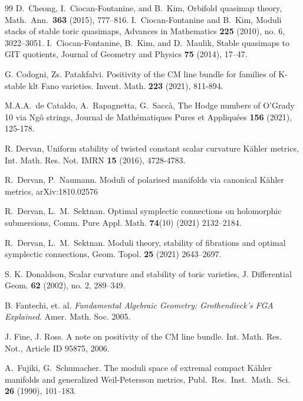 \documentclass[12pt,twoside]{amsart}
\theoremstyle{definition}
\begin{document}
\begin{thebibliography}{99}
D.~Cheong, I.~Ciocan-Fontanine, and B.~Kim, Orbifold quasimap theory, Math.~Ann.~{\bf363} (2015), 777–816.
 I.~Ciocan-Fontanine and B.~Kim, Moduli stacks of stable toric quasimaps, Advances in Mathematics {\bf225} (2010), no. 6, 3022–3051.
 I.~Ciocan-Fontanine, B.~Kim, and D.~Maulik, Stable quasimaps to GIT quotients, Journal of Geometry and Physics {\bf75} (2014), 17–47.




 G. Codogni, Zs. Patakfalvi. Positivity of the CM line bundle for families of K-stable klt Fano varieties. Invent. Math. {\bf223}  (2021), 811-894.


 M.A.A.~de Cataldo, A.~Rapagnetta, G.~Sacc\`{a}, The Hodge numbers of O'Grady 10 via Ng\^{o} strings, Journal de Math\'{e}matiques Pures et Appliqu\'ees
{\bf156} (2021), 125-178.



 R. Dervan, Uniform stability of twisted constant scalar curvature K\"{a}hler metrics, Int. Math. Res. Not. IMRN {\bf 15} (2016), 4728-4783.

 R.~Dervan, P.~Naumann. Moduli of polarised manifolds via canonical K\"{a}hler metrics, arXiv:1810.02576


 R.~Dervan, L.~M.~Sektnan. Optimal symplectic connections on holomorphic submersions, Comm. Pure
Appl. Math. {\bf74}(10) (2021) 2132--2184.

 R.~Dervan, L.~M.~Sektnan. Moduli theory, stability of fibrations and optimal symplectic connections,
Geom. Topol. {\bf25} (2021) 2643--2697.



 S. K. Donaldson, Scalar curvature and stability of toric varieties, J. Differential Geom. {\bf62} (2002), no. 2, 289--349.



 B. Fantechi, et. al. {\it Fundamental Algebraic Geometry: Grothendieck's FGA Explained}. Amer. Math. Soc. 2005.





 J. Fine, J. Ross. A note on positivity of the CM line bundle. Int. Math. Res. Not., Article ID 95875, 2006.

A.~Fujiki, G.~Schumacher. The moduli space of extremal compact K\"{a}hler manifolds and generalized Weil-Petersson metrics, Publ.~Res.~Inst.~Math.~Sci. {\bf26} (1990), 101--183.


\end{thebibliography}
\end{document}
